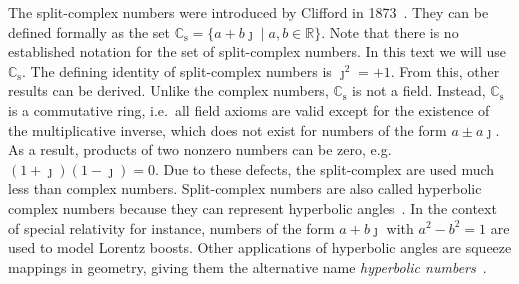 \documentclass[11pt,a4paper]{book}
\begin{document}
The split-complex numbers were introduced by Clifford in 1873~\cite{b650}. 
They can be defined formally as the set $\mathbb C_{\mathrm
  s} = \{a+b\jmath \mid
a, b \in \mathbb R\}$.  
Note that there is no established notation for the set of
split-complex numbers.  In this text we will use $\mathbb C_{\mathrm s}$.  The
defining identity of split-complex numbers is $\jmath^2 = +1$.  From
this, other results can be derived. Unlike the complex numbers, $\mathbb
C_{\mathrm s}$ is not a 
field.  Instead, $\mathbb C_{\mathrm s}$ is a commutative ring,
i.e.\ all field axioms are valid except for the existence of
the multiplicative inverse, which does not exist for numbers of the form
 $a\pm a\jmath$. 
As a result, products of two nonzero numbers can be zero,
e.g.\ $(1+\jmath)(1-\jmath)=0$.   
Due to these defects, the split-complex are used much less than complex
numbers.  
Split-complex numbers are also called hyperbolic complex numbers because
they can represent hyperbolic angles~\cite{b649}. 
In the context of special relativity for instance, numbers of the form 
$a+b\jmath$ with $a^2-b^2 = 1$ are used to model Lorentz boosts. 
Other applications of hyperbolic angles are squeeze mappings in
geometry, giving them the alternative name \emph{hyperbolic
  numbers}~\cite{b666}.  
\end{document}
